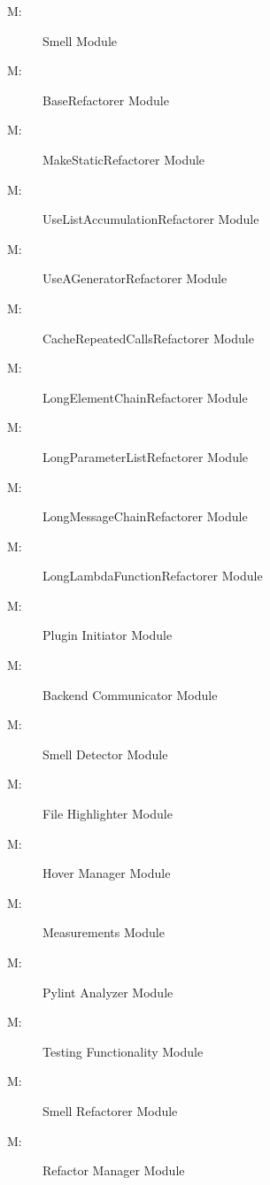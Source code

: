 \documentclass[12pt, titlepage]{article}
\newcounter{mnum}
\newcommand{\mthemnum}{M\themnum}
\begin{document}
\begin{description}
  \item [ \mthemnum \label{mSmell}:] Smell Module
  \item [ \mthemnum \label{mBR}:] BaseRefactorer Module
  \item [ \mthemnum \label{mMIMR}:] MakeStaticRefactorer Module
  \item [ \mthemnum \label{mSCLR}:] UseListAccumulationRefactorer Module
  \item [ \mthemnum \label{mUGENR}:] UseAGeneratorRefactorer Module
  \item [ \mthemnum \label{mCRC}:] CacheRepeatedCallsRefactorer Module
  \item [ \mthemnum \label{mLEC}:] LongElementChainRefactorer Module
  \item [ \mthemnum \label{mLPL}:] LongParameterListRefactorer Module
  \item [ \mthemnum \label{mLMC}:] LongMessageChainRefactorer Module
  \item [ \mthemnum \label{mLLF}:] LongLambdaFunctionRefactorer Module
  \item [ \mthemnum \label{mExe}:] Plugin Initiator Module
  \item [ \mthemnum \label{mBac}:] Backend Communicator Module
  \item [ \mthemnum \label{mDet}:] Smell Detector Module
  \item [ \mthemnum \label{mHig}:] File Highlighter Module
  \item [ \mthemnum \label{mHov}:] Hover Manager Module
  \item [ \mthemnum \label{mMeasure}:] Measurements Module
  \item [ \mthemnum \label{mPyA}:] Pylint Analyzer Module
  \item [ \mthemnum \label{mTest}:] Testing Functionality Module
  \item [ \mthemnum \label{mRef}:] Smell Refactorer  Module
  \item [ \mthemnum \label{mMan}:] Refactor Manager Module
\end{description}
\end{document}
